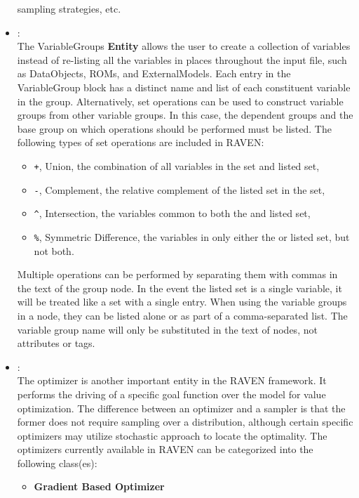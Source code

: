 \begin{itemize}
   sampling strategies, etc.
  \item \textit{}:
    \\ The VariableGroups \textbf{Entity} allows the user to create a collection of variables instead of re-listing all
    the variables in places throughout the input file, such as DataObjects, ROMs, and ExternalModels. Each entry in the
    VariableGroup block has a distinct name and list of each constituent variable in the group. Alternatively, set operations
    can be used to construct variable groups from other variable groups. In this case, the dependent groups and the
    base group on which operations should be performed must be listed.  The following types of set operations are included in RAVEN:
    \begin{itemize}
      \item \texttt{+}, Union, the combination of all variables in the  set and listed set,
      \item \texttt{-}, Complement, the relative complement of the listed set in the  set,
      \item \texttt{\^}, Intersection, the variables common to both the  and listed set,
      \item \texttt{\%}, Symmetric Difference, the variables in only either the  or listed set,
      but not both.
    \end{itemize}
    Multiple operations can be performed by separating them with commas in the text of the group node.  In the
    event the listed set is a single variable, it will be treated like a set with a single entry.
    When using the variable groups in a node, they can be listed alone or as part of a comma-separated list.  The
    variable group name will only be substituted in the text of nodes, not attributes or tags.
  \item \textit{}:
    \\ The optimizer is another important entity in the RAVEN framework. It performs the driving of a specific goal function
    over the model for value optimization. The difference between an optimizer and a sampler is that the former does not require
    sampling over a distribution, although certain specific optimizers may utilize stochastic approach to locate the optimality.
    The optimizers currently available in RAVEN can be categorized into the following class(es):
    \begin{itemize}
      \item \textbf{Gradient Based Optimizer}

\end{itemize}
\end{itemize}
